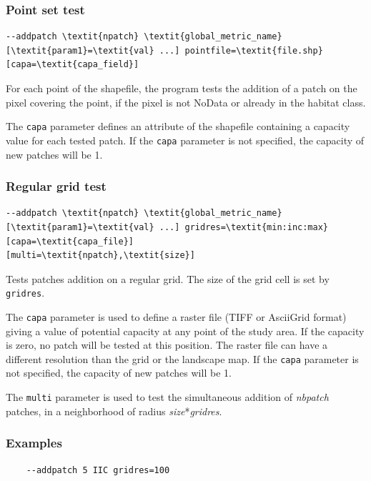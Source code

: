 \documentclass[a4paper,10pt]{report}
\begin{document}
\subsubsection{Point set test}
\begin{Verbatim}[commandchars=\\\{\}]
--addpatch \textit{npatch} \textit{global_metric_name} [\textit{param1}=\textit{val} ...] pointfile=\textit{file.shp} [capa=\textit{capa_field}]
\end{Verbatim}

For each point of the shapefile, the program tests the addition of a patch on the pixel covering the point, if the pixel is not NoData or already in the habitat class.

The \verb|capa| parameter defines an attribute of the shapefile containing a capacity value for each tested patch.
If the \verb|capa| parameter is not specified, the capacity of new patches will be 1.


\subsubsection{Regular grid test}
\begin{Verbatim}[commandchars=\\\{\}]
--addpatch \textit{npatch} \textit{global_metric_name} [\textit{param1}=\textit{val} ...] gridres=\textit{min:inc:max} [capa=\textit{capa_file}]
[multi=\textit{npatch},\textit{size}]
\end{Verbatim}
Tests patches addition on a regular grid. The size of the grid cell is set by \verb|gridres|.

The \verb|capa| parameter is used to define a raster file (TIFF or AsciiGrid format) giving a value of potential capacity at any point of the study area.
If the capacity is zero, no patch will be tested at this position. The raster file can have a different resolution than the grid or the landscape map.
If the \verb|capa| parameter is not specified, the capacity of new patches will be 1.

The \verb|multi| parameter is used to test the simultaneous addition of \textit{nbpatch} patches, in a neighborhood of radius \textit{size}*\textit{gridres}.

\subsubsection{Examples}

\begin{Verbatim}
	--addpatch 5 IIC gridres=100
\end{Verbatim}
\end{document}
